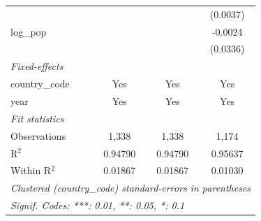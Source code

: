 \begin{tabular}{lccc}
                                            &                 &                 & (0.0037)\\   
   log\_pop                                 &                 &                 & -0.0024\\   
                                            &                 &                 & (0.0336)\\   
   \midrule
   \emph{Fixed-effects}\\
   country\_code                            & Yes             & Yes             & Yes\\  
   year                                     & Yes             & Yes             & Yes\\  
   \midrule
   \emph{Fit statistics}\\
   Observations                             & 1,338           & 1,338           & 1,174\\  
   R$^2$                                    & 0.94790         & 0.94790         & 0.95637\\  
   Within R$^2$                             & 0.01867         & 0.01867         & 0.01030\\  
   \midrule \midrule
   \multicolumn{4}{l}{\emph{Clustered (country\_code) standard-errors in parentheses}}\\
   \multicolumn{4}{l}{\emph{Signif. Codes: ***: 0.01, **: 0.05, *: 0.1}}\\
\end{tabular}
\par\endgroup


